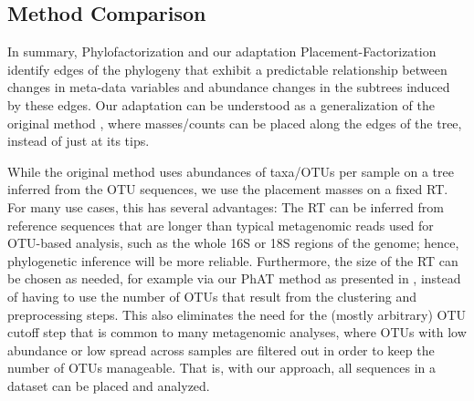 
\subsection{Method Comparison}
\label{sec:Factorization:sub:Methods:sub:MethodComparison}

In summary, Phylofactorization and our adaptation Placement-Factorization
identify edges of the phylogeny that exhibit a predictable relationship between changes in meta-data variables and
abundance changes in the subtrees induced by these edges.
Our adaptation can be understood as a generalization of the original method \cite{Washburne2017a,Washburne2019},
where masses/counts can be placed along the edges of the tree, instead of just at its tips.

While the original method uses abundances of taxa/OTUs per sample on a tree inferred from the OTU sequences,
we use the placement masses on a fixed \acf{RT}.
For many use cases, this has several advantages:
The \ac{RT} can be inferred from reference sequences that are longer
than typical metagenomic reads used for OTU-based analysis, such as the whole 16S or 18S regions of the genome;
hence, phylogenetic inference will be more reliable.
Furthermore, the size of the \ac{RT} can be chosen as needed,
for example via our \acf{PhAT} method as presented in ,
instead of having to use the number of OTUs that result from the clustering and preprocessing steps.
This also eliminates the need for the (mostly arbitrary) OTU cutoff step that is common to many metagenomic analyses,
where OTUs with low abundance or low spread across samples are filtered out in order to keep the number of OTUs manageable.
That is, with our approach, all sequences in a dataset can be placed and analyzed.

